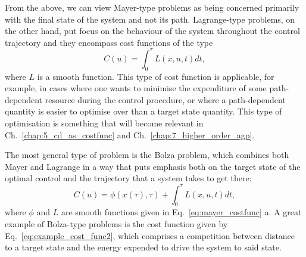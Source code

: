 \documentclass[a4paper,oneside,11pt]{book}
\begin{document}
From the above, we can view Mayer-type problems as being concerned primarily with the final state of the system and not its path. Lagrange-type problems, on the other hand, put focus on the behaviour of the system throughout the control trajectory and they encompass cost functions of the type
\begin{equation}\label{eq:lagrange_type_costfunc}
    C(u) = \int_0^{\tau} L(x, u, t) dt,
\end{equation}
where $L$ is a smooth function. This type of cost function is applicable, for example, in cases where one wants to minimise the expenditure of some path-dependent resource during the control procedure, or where a path-dependent quantity is easier to optimise over than a target state quantity. This type of optimisation is something that will become relevant in Ch.~\ref{chap:5_cd_as_costfunc} and Ch.~\ref{chap:7_higher_order_agp}. 

The most general type of problem is the Bolza problem, which combines both Mayer and Lagrange in a way that puts emphasis both on the target state of the optimal control and the trajectory that a system takes to get there:
\begin{equation}\label{eq:bolza_tyoe_costfunc}
    C(u) = \phi(x(\tau), \tau) + \int_0^{\tau} L(x, u, t) dt,
\end{equation}
where $\phi$ and $L$ are smooth functions given in Eq.~\eqref{eq:mayer_costfunc} a. A great example of Bolza-type problems is the cost function given by Eq.~\eqref{eq:example_cost_func2}, which comprises a competition between distance to a target state and the energy expended to drive the system to said state. 
\end{document}
